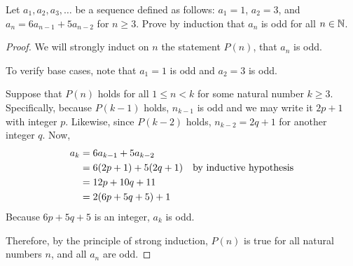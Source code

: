 \documentclass{agony}
\begin{document}
\question Let $a_1, a_2, a_3, \dots$ be a sequence defined as follows: $a_1 = 1$, $a_2 = 3$, and $a_n = 6a_{n-1} + 5a_{n-2}$ for $n \geq 3$.
Prove by induction that $a_n$ is odd for all $n\in\mathbb{N}$.
\begin{proof}
  We will strongly induct on $n$ the statement $P(n)$, that $a_n$ is odd.

  To verify base cases, note that $a_1=1$ is odd and $a_2=3$ is odd.

  Suppose that $P(n)$ holds for all $1 \leq n < k$ for some natural number $k \geq 3$.
  Specifically, because $P(k-1)$ holds, $n_{k-1}$ is odd and we may write it $2p+1$ with integer $p$.
  Likewise, since $P(k-2)$ holds, $n_{k-2} = 2q+1$ for another integer $q$. Now,
  \begin{align*}
    a_k & = 6a_{k-1} + 5a_{k-2}   \\
        & = 6(2p+1) + 5(2q+1) & \text{by inductive hypothesis} \\
        & = 12p+10q+11            \\
        & = 2(6p+5q+5) + 1
  \end{align*}
  Because $6p+5q+5$ is an integer, $a_k$ is odd.

  Therefore, by the principle of strong induction,
  $P(n)$ is true for all natural numbers $n$, and all $a_n$ are odd.
\end{proof}
\end{document}
